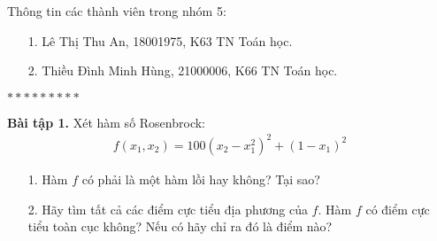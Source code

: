 \documentclass[12pt]{article}
\begin{document}
    Thông tin các thành viên trong nhóm 5:
    \begin{enumerate}
        \item[1.] Lê Thị Thu An, 18001975, K63 TN Toán học.
        \item[2.] Thiều Đình Minh Hùng, 21000006, K66 TN Toán học.
    \end{enumerate}
    \begin{center}
        $*********$
    \end{center}
    \textbf{Bài tập 1.} Xét hàm số Rosenbrock:
    \begin{align*}
        f(x_1,x_2) = 100(x_2 - x_1^2)^2 + (1 - x_1)^2
    \end{align*}
    \begin{enumerate}
        \item[1.] Hàm $f$ có phải là một hàm lồi hay không? Tại sao?
        \item[2.] Hãy tìm tất cả các điểm cực tiểu địa phương của $f$. Hàm $f$ có điểm cực tiểu toàn cục không?
        Nếu có hãy chỉ ra đó là điểm nào?
    \end{enumerate}
\end{document}
